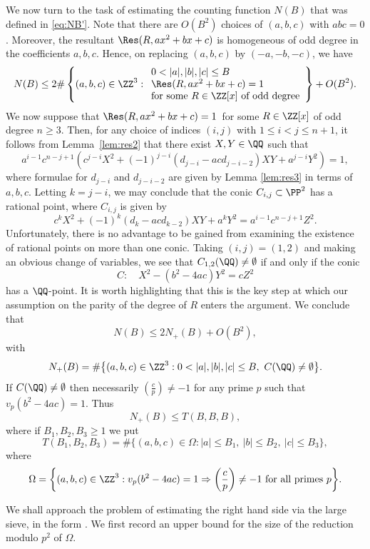 We
now turn to the task of estimating the counting function $N(B)$ that was defined in
\eqref{eq:NB'}.
Note that there are $O(B^2)$ choices of $(a,b,c)$ with $abc= 0$.
Moreover, the resultant $\Res(R,ax^2+bx+c)$ is homogeneous of odd degree
in the coefficients $a,b,c$. Hence, on replacing $(a,b,c)$ by $(-a,-b,-c)$, we have
\[
N(B)\leq
2\#\left\{(a,b,c)\in \ZZ^3:
\begin{array}{l}
0<|a|,|b|,|c|\leq B\\
\Res(R,ax^2+bx+c)=1\\
\text{for some $R\in \ZZ[x]$ of odd degree}
\end{array}
\right\}
+O(B^2).
\]
We now suppose that
$\Res(R,ax^2+bx+c)=1$\
for some $R\in \ZZ[x]$ of odd degree $n\geq 3$.
Then, for any choice of indices $(i,j)$ with $1\leq i<j\leq n+1$, it follows from Lemma~\ref{lem:res2} that
there exist $X,Y\in \QQ$ such that
\[
a^{i-1}c^{n-j+1}\left(c^{j-i}X^2+(-1)^{j-i}(d_{j-i}-acd_{j-i-2})XY+a^{j-i}Y^2\right)= 1,
\]
where formulae for $d_{j-i}$ and $d_{j-i-2}$ are given by Lemma \ref{lem:res3} in
terms of $a,b,c$.
Letting $k=j-i$, we may conclude that the conic $C_{i,j}\subset \PP^2$
has a rational point, where $C_{i,j}$ is given by
\[
c^{k}X^2+(-1)^{k}(d_{k}-acd_{k-2})XY+a^{k}Y^2= a^{i-1}c^{n-j+1}Z^2.
\]
Unfortunately, there is no advantage to be gained from
examining the existence of rational points on more than one conic.
Taking $(i,j)=(1,2)$ and making an obvious change of variables, we see that $C_{1,2}(\QQ)\neq \emptyset$ if and only if
the conic
\[
C: \quad X^2-(b^2-4ac)Y^2=cZ^2
\]
has a $\QQ$-point. It is worth highlighting that this is the key step at which our assumption on the parity of the degree of $R$ enters the argument. We conclude that
\begin{equation}\label{eq:comic}
N(B)\leq 2N_+(B)+O(B^2),
\end{equation}
with
\[
N_+(B)=
\#\bigl\{(a,b,c)\in \ZZ^3:
0<|a|,|b|,|c|\leq B,~
C(\QQ)\neq \emptyset
\bigr\}.
\]
If $C(\QQ)\neq \emptyset$ then necessarily
$(\frac{c}{p})\neq -1$
for any prime $p$ such that $v_p(b^2-4ac)=1$.
Thus
\begin{equation}\label{eq:book}
N_+(B)\leq
T(B,B,B),
\end{equation}
where
if $B_1,B_2,B_3\geq 1$ we put
\[
T(B_1,B_2,B_3)=
\#\bigl\{(a,b,c)\in \Omega:
|a|\leq B_1,~|b|\leq B_2,~|c|\leq B_3
\bigr\},
\]
where
\[
\Omega=
\biggl\{(a,b,c)\in \ZZ^3:
v_p(b^2-4ac)=1\Rightarrow \left(\frac{c}{p}\right)\neq -1
\text{ for all primes $p$}\biggr\}.
\]

We shall approach the problem of estimating the right hand side via the
large sieve,
in the form
\cite[Lem.\,6.3]{large}.
We first record an upper bound for the size of the reduction modulo $p^2$ of $\Omega$.

